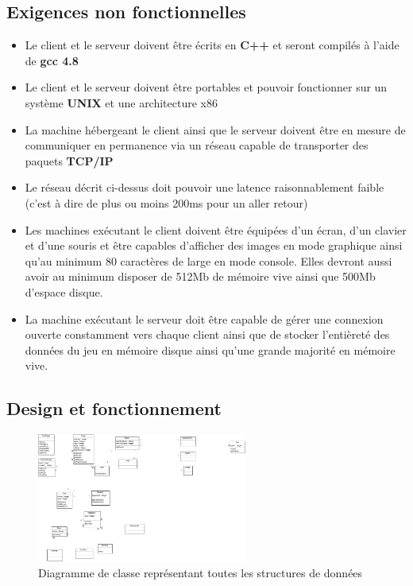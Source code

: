 \documentclass[a4paper]{article}
\begin{document}
\subsection{Exigences non fonctionnelles}
\label{enf}
\begin{itemize}
\item Le \gls{client} et le \gls{serveur} doivent être écrits en \textbf{C++} et seront compilés à l'aide de \textbf{gcc 4.8}
\item Le \gls{client} et le \gls{serveur} doivent être portables et pouvoir fonctionner sur un système \textbf{UNIX} et une architecture x86
\item La machine hébergeant le \gls{client} ainsi que le \gls{serveur} doivent être en mesure de communiquer en permanence via un réseau capable de transporter des paquets \textbf{TCP/IP}
\item Le réseau décrit ci-dessus doit pouvoir une latence raisonnablement faible (c'est à dire de plus ou moins 200ms pour un aller retour)
\item Les machines exécutant le \gls{client} doivent être équipées d'un écran, d'un clavier et d'une souris et être capables d'afficher des images en mode graphique ainsi qu'au minimum 80 caractères de large en mode console. Elles devront aussi avoir au minimum disposer de 512Mb de mémoire vive ainsi que 500Mb d'espace disque.
\item La machine exécutant le \gls{serveur} doit être capable de gérer une connexion ouverte constamment vers chaque \gls{client} ainsi que de stocker l'entièreté des données du jeu en mémoire disque ainsi qu'une grande majorité en mémoire vive.
\end{itemize}

\subsection{Design et fonctionnement}
\begin{figure}[h]
   \caption{\label{3} Diagramme de classe représentant toutes les structures de données}
   \begin{center}
   \includegraphics[height=120pt]{uml/classDiagram.eps}
   \end{center}
\end{figure}

\printindex
\tableofcontents
\listoffigures
\end{document}
